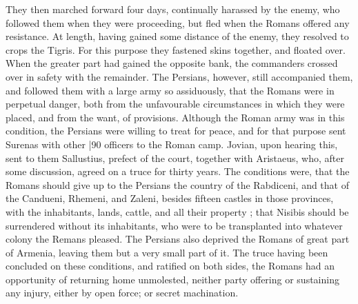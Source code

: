 They then marched forward four days, continually harassed by the enemy, who followed them when they were proceeding, but fled when the Romans offered any resistance. At length, having gained some distance of the enemy, they resolved to crops the Tigris. For this purpose they fastened skins together, and floated over. When the greater part had gained the opposite bank, the commanders crossed over in safety with the remainder. The Persians, however, still accompanied them, and followed them with a large army so assiduously, that the Romans were in perpetual danger, both from the unfavourable circumstances in which they were placed, and from the want, of provisions. Although the Roman army was in this condition, the Persians were willing to treat for peace, and for that purpose sent Surenas with other
|90 officers to the Roman camp. Jovian, upon hearing this, sent to them Sallustius, prefect of the court, together with Aristaeus,
who, after some discussion, agreed on a truce for thirty years. The conditions were, that the Romans should give up to the Persians the country of the Rabdiceni, and that of the Candueni, Rhemeni, and Zaleni, besides fifteen castles in those provinces, with the inhabitants, lands, cattle, and all their property ; that Nisibis should be surrendered without its inhabitants, who were to be transplanted into whatever colony the Remans pleased. The Persians also deprived the Romans of great part of Armenia, leaving them but a very small part of it. The truce having been concluded on these conditions, and ratified on both sides, the Romans had an opportunity of returning home unmolested, neither party offering or sustaining any injury, either by open force; or secret machination.

